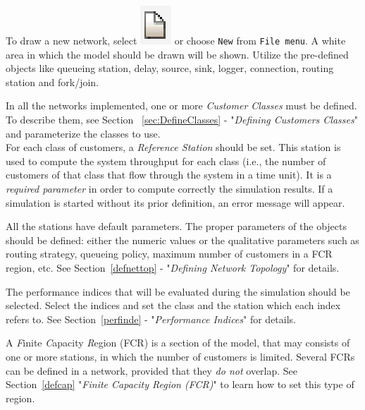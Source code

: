 
To draw a new network, select
\includegraphics[scale=.5]{img/jsimg/new.eps} or choose
\texttt{New} from \texttt{File menu}.  A white area in which the
model should be drawn will be shown. Utilize the pre-defined objects
like queueing station, delay,
source, sink, logger, connection, routing station and fork/join.


In all the networks implemented, one or more \emph{Customer Classes} must
be defined. To describe them, see Section ~\ref{sec:DefineClasses} -
"\emph{Defining Customers Classes}" and parameterize the classes to use.\\
For each class of customers, a \emph{Reference Station} should be
set. This station is used to compute the system throughput for
each class (i.e., the number of customers of that class that flow
through the system in a time unit). It is a \emph{required
parameter} in order to compute correctly the simulation results.
If a simulation is started without its prior definition, an error
message will appear.


All the stations have default parameters. The proper parameters of
the objects should be defined: either the numeric values or the
qualitative parameters such as routing strategy, queueing policy,
maximum number of customers in a FCR region, etc. See
Section~\ref{defnettop} - "\emph{Defining Network Topology}" for
details.


The performance indices that will be evaluated during the
simulation should be selected. Select the indices and set the
class and the station which each index refers to. See
Section~\ref{perfinde} - "\emph{Performance Indices}" for details.


A \emph{F}inite \emph{C}apacity \emph{R}egion (FCR) is a section
of the model, that may consists of one or more stations, in which
the number of customers is limited. Several FCRs can be defined in
a network, provided that they \emph{do not} overlap. See
Section~\ref{defcap} "\emph{Finite Capacity Region (FCR)}" to
learn how to set this type of region.

